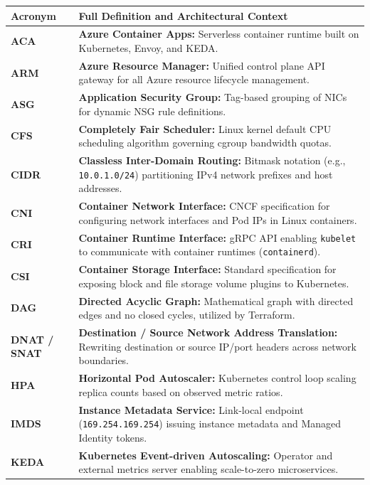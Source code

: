 \documentclass[11pt,oneside]{book}
\begin{document}
\begin{table}[htbp]
\centering\small
\begin{tabular}{lp{9.5cm}}
\toprule
\textbf{Acronym} & \textbf{Full Definition and Architectural Context} \\
\midrule
\textbf{ACA} & \textbf{Azure Container Apps:} Serverless container runtime built on Kubernetes, Envoy, and KEDA. \\
\textbf{ARM} & \textbf{Azure Resource Manager:} Unified control plane API gateway for all Azure resource lifecycle management. \\
\textbf{ASG} & \textbf{Application Security Group:} Tag-based grouping of NICs for dynamic NSG rule definitions. \\
\textbf{CFS} & \textbf{Completely Fair Scheduler:} Linux kernel default CPU scheduling algorithm governing cgroup bandwidth quotas. \\
\textbf{CIDR} & \textbf{Classless Inter-Domain Routing:} Bitmask notation (e.g., \texttt{10.0.1.0/24}) partitioning IPv4 network prefixes and host addresses. \\
\textbf{CNI} & \textbf{Container Network Interface:} CNCF specification for configuring network interfaces and Pod IPs in Linux containers. \\
\textbf{CRI} & \textbf{Container Runtime Interface:} gRPC API enabling \texttt{kubelet} to communicate with container runtimes (\texttt{containerd}). \\
\textbf{CSI} & \textbf{Container Storage Interface:} Standard specification for exposing block and file storage volume plugins to Kubernetes. \\
\textbf{DAG} & \textbf{Directed Acyclic Graph:} Mathematical graph with directed edges and no closed cycles, utilized by Terraform. \\
\textbf{DNAT / SNAT} & \textbf{Destination / Source Network Address Translation:} Rewriting destination or source IP/port headers across network boundaries. \\
\textbf{HPA} & \textbf{Horizontal Pod Autoscaler:} Kubernetes control loop scaling replica counts based on observed metric ratios. \\
\textbf{IMDS} & \textbf{Instance Metadata Service:} Link-local endpoint (\texttt{169.254.169.254}) issuing instance metadata and Managed Identity tokens. \\
\textbf{KEDA} & \textbf{Kubernetes Event-driven Autoscaling:} Operator and external metrics server enabling scale-to-zero microservices. \\

\end{tabular}
\end{table}
\end{document}
